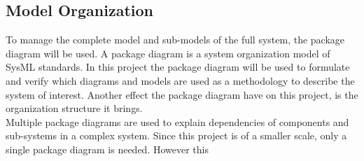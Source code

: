 \subsection{Model Organization}
To manage the complete model and sub-models of the full system, the package diagram will be used. A package diagram is a system organization model of SysML standards. In this project the package diagram will be used to formulate and verify which diagrams and models are used as a methodology to describe the system of interest. Another effect the package diagram have on this project, is the organization structure it brings.\\

Multiple package diagrams are used to explain dependencies of components and sub-systems in a complex system. Since this project is of a smaller scale, only a single package diagram is needed. However this 
